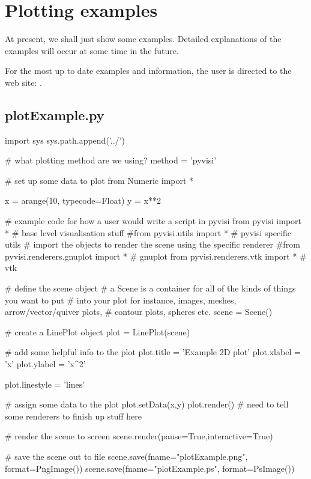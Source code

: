 
\chapter{Plotting examples}

At present, we shall just show some examples.  Detailed explanations of the
examples will occur at some time in the future.

For the most up to date examples and information, the user is directed to
the \pyvisi web site:
.

\section{plotExample.py}

\begin{pythonCode}
import sys
sys.path.append('../')

# what plotting method are we using?
method = 'pyvisi'

# set up some data to plot
from Numeric import *

x = arange(10, typecode=Float)
y = x**2

# example code for how a user would write a script in pyvisi
from pyvisi import *          # base level visualisation stuff
#from pyvisi.utils import *   # pyvisi specific utils
# import the objects to render the scene using the specific renderer
#from pyvisi.renderers.gnuplot import *   # gnuplot
from pyvisi.renderers.vtk import *       # vtk
   
# define the scene object
# a Scene is a container for all of the kinds of things you want to put 
# into your plot for instance, images, meshes, arrow/vector/quiver plots, 
# contour plots, spheres etc.
scene = Scene()
    
# create a LinePlot object
plot = LinePlot(scene)
    
# add some helpful info to the plot
plot.title = 'Example 2D plot'
plot.xlabel = 'x'
plot.ylabel = 'x^2'

plot.linestyle = 'lines'
    
# assign some data to the plot
plot.setData(x,y)
plot.render()  # need to tell some renderers to finish up stuff here

# render the scene to screen
scene.render(pause=True,interactive=True)

# save the scene out to file
scene.save(fname="plotExample.png", format=PngImage())
scene.save(fname="plotExample.ps", format=PsImage())
\end{pythonCode}

